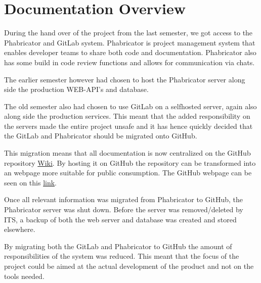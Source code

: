 \section{Documentation Overview}\label{SEC:DocumentationOverview}
During the hand over of the project from the last semester, we got access to the Phabricator and GitLab system. 
Phabricator is project management system that enables developer teams to share both code and documentation. 
Phabricator also has some build in code review functions and allows for communication via chats. 

The earlier semester however had chosen to host the Phabricator server along side the production WEB-API's and database.

The old semester also had chosen to use GitLab on a selfhosted server, again also along side the production services. 
This meant that the added responsibility on the servers made the entire project unsafe and it has hence quickly decided that the GitLab and Phabricator should be migrated onto GitHub. 

This migration means that all documentation is now centralized on the GitHub repository \href{https://github.com/aau-giraf/wiki}{Wiki}. 
By hosting it on GitHub the repository can be transformed into an webpage more suitable for public consumption.
The GitHub webpage can be seen on this \href{https://aau-giraf.github.io/wiki/}{link}.

Once all relevant information was migrated from Phabricator to GitHub, the Phabricator server was shut down. 
Before the server was removed/deleted by ITS, a backup of both the web server and database was created and stored elsewhere.

By migrating both the GitLab and Phabricator to GitHub the amount of responsibilities of the system was reduced. 
This meant that the focus of the project could be aimed at the actual development of the product and not on the tools needed.
